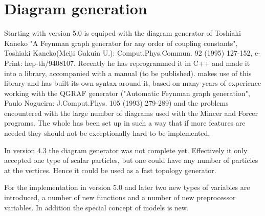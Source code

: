  
\chapter{Diagram generation}
\label{diagrams}

Starting with version 5.0 \FORM{} is equiped with the diagram generator of 
Toshiaki Kaneko "A Feynman graph generator for any order of coupling 
constants", Toshiaki Kaneko(Meiji Gakuin U.): Comput.Phys.Commun. 92 (1995) 
127-152, e-Print: hep-th/9408107. Recently he has reprogrammed it in C++ 
and made it into a library, accompanied with a manual (to be published). 
\FORM{} makes use of this library and has built its own syntax around it, 
based on many years of experience working with the QGRAF generator 
("Automatic Feynman graph generation", Paulo Nogueira: J.Comput.Phys. 105 
(1993) 279-289) and the problems encountered with the large number of 
diagrams used with the Mincer and Forcer programs. The whole has been set 
up in such a way that if more features are needed they should not be 
exceptionally hard to be implemented.

In version 4.3 the diagram generator was not complete yet. Effectively it 
only accepted one type of scalar particles, but one could have any number 
of particles at the vertices. Hence it could be used as a fast topology 
generator.

For the \FORM{} implementation in version 5.0 and later two new types of 
variables are introduced, a number of new functions and a number of new 
preprocessor variables. In addition the special concept of models is new.

